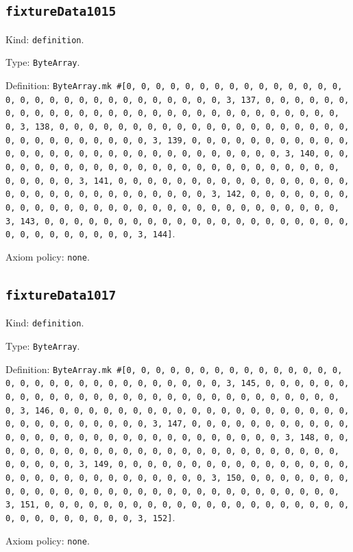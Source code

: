 \documentclass[11pt]{article}
\begin{document}
\subsection*{\texttt{fixtureData1015}}
\noindent Kind: \texttt{definition}.\par
\noindent Type: \texttt{ByteArray}.\par
\noindent Definition: \texttt{ByteArray.mk \#[0, 0, 0, 0, 0, 0, 0, 0, 0, 0, 0, 0, 0, 0, 0, 0, 0, 0, 0, 0, 0, 0, 0, 0, 0, 0, 0, 0, 0, 0, 3, 137, 0, 0, 0, 0, 0, 0, 0, 0, 0, 0, 0, 0, 0, 0, 0, 0, 0, 0, 0, 0, 0, 0, 0, 0, 0, 0, 0, 0, 0, 0, 3, 138, 0, 0, 0, 0, 0, 0, 0, 0, 0, 0, 0, 0, 0, 0, 0, 0, 0, 0, 0, 0, 0, 0, 0, 0, 0, 0, 0, 0, 0, 0, 3, 139, 0, 0, 0, 0, 0, 0, 0, 0, 0, 0, 0, 0, 0, 0, 0, 0, 0, 0, 0, 0, 0, 0, 0, 0, 0, 0, 0, 0, 0, 0, 3, 140, 0, 0, 0, 0, 0, 0, 0, 0, 0, 0, 0, 0, 0, 0, 0, 0, 0, 0, 0, 0, 0, 0, 0, 0, 0, 0, 0, 0, 0, 0, 3, 141, 0, 0, 0, 0, 0, 0, 0, 0, 0, 0, 0, 0, 0, 0, 0, 0, 0, 0, 0, 0, 0, 0, 0, 0, 0, 0, 0, 0, 0, 0, 3, 142, 0, 0, 0, 0, 0, 0, 0, 0, 0, 0, 0, 0, 0, 0, 0, 0, 0, 0, 0, 0, 0, 0, 0, 0, 0, 0, 0, 0, 0, 0, 3, 143, 0, 0, 0, 0, 0, 0, 0, 0, 0, 0, 0, 0, 0, 0, 0, 0, 0, 0, 0, 0, 0, 0, 0, 0, 0, 0, 0, 0, 0, 0, 3, 144]}.\par
\noindent Axiom policy: \texttt{none}.\par
\subsection*{\texttt{fixtureData1017}}
\noindent Kind: \texttt{definition}.\par
\noindent Type: \texttt{ByteArray}.\par
\noindent Definition: \texttt{ByteArray.mk \#[0, 0, 0, 0, 0, 0, 0, 0, 0, 0, 0, 0, 0, 0, 0, 0, 0, 0, 0, 0, 0, 0, 0, 0, 0, 0, 0, 0, 0, 0, 3, 145, 0, 0, 0, 0, 0, 0, 0, 0, 0, 0, 0, 0, 0, 0, 0, 0, 0, 0, 0, 0, 0, 0, 0, 0, 0, 0, 0, 0, 0, 0, 3, 146, 0, 0, 0, 0, 0, 0, 0, 0, 0, 0, 0, 0, 0, 0, 0, 0, 0, 0, 0, 0, 0, 0, 0, 0, 0, 0, 0, 0, 0, 0, 3, 147, 0, 0, 0, 0, 0, 0, 0, 0, 0, 0, 0, 0, 0, 0, 0, 0, 0, 0, 0, 0, 0, 0, 0, 0, 0, 0, 0, 0, 0, 0, 3, 148, 0, 0, 0, 0, 0, 0, 0, 0, 0, 0, 0, 0, 0, 0, 0, 0, 0, 0, 0, 0, 0, 0, 0, 0, 0, 0, 0, 0, 0, 0, 3, 149, 0, 0, 0, 0, 0, 0, 0, 0, 0, 0, 0, 0, 0, 0, 0, 0, 0, 0, 0, 0, 0, 0, 0, 0, 0, 0, 0, 0, 0, 0, 3, 150, 0, 0, 0, 0, 0, 0, 0, 0, 0, 0, 0, 0, 0, 0, 0, 0, 0, 0, 0, 0, 0, 0, 0, 0, 0, 0, 0, 0, 0, 0, 3, 151, 0, 0, 0, 0, 0, 0, 0, 0, 0, 0, 0, 0, 0, 0, 0, 0, 0, 0, 0, 0, 0, 0, 0, 0, 0, 0, 0, 0, 0, 0, 3, 152]}.\par
\noindent Axiom policy: \texttt{none}.\par
\end{document}
